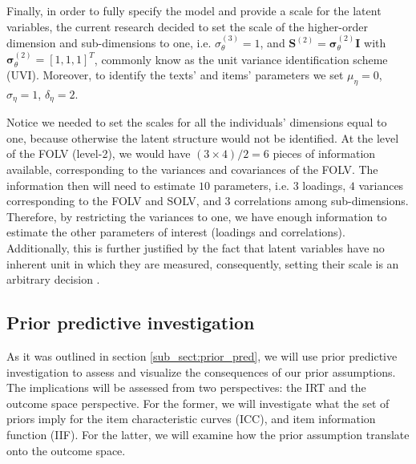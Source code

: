 Finally, in order to fully specify the model and provide a scale for the latent variables, the current research decided to set the scale of the higher-order dimension and sub-dimensions to one, i.e. $\sigma^{(3)}_{\theta} = 1$, and $\mathbf{S}^{(2)} = \pmb{\sigma}^{(2)}_{\theta} \mathbf{I}$ with $\pmb{\sigma}^{(2)}_{\theta} = [1, 1, 1]^{T}$, commonly know as the unit variance identification scheme (UVI). Moreover, to identify the texts' and items' parameters we set $\mu_{\eta} = 0$, $\sigma_{\eta}=1$, $\delta_{\eta}=2$.

Notice we needed to set the scales for all the individuals' dimensions equal to one, because otherwise the latent structure would not be identified. At the level of the FOLV (level-2), we would have $(3 \times 4)/2 = 6$ pieces of information available, corresponding to the variances and covariances of the FOLV. The information then will need to estimate $10$ parameters, i.e. $3$ loadings, $4$ variances corresponding to the FOLV and SOLV, and $3$ correlations among sub-dimensions. Therefore, by restricting the variances to one, we have enough information to estimate the other parameters of interest (loadings and correlations). Additionally, this is further justified by the fact that latent variables have no inherent unit in which they are measured, consequently, setting their scale is an arbitrary  decision \cite{Beaujean_2014}.


\begin{comment}
On the other hand, from the texts and items perspective, at the level of the items (level-2) we would have $(25 \times 26)/2 = 325$ pieces of information available, corresponding to the variances and covariances of the items dimensions. With that information we would need to estimate $30$ parameters, corresponding to $25$ items' dimension variances, and $5$ texts' dimension variances. notice in this case, we do not need to estimate $25$ loadings, as they are assumed to be $1$.
\end{comment}


\subsection{Prior predictive investigation}

As it was outlined in section \ref{sub_sect:prior_pred}, we will use prior predictive investigation to assess and visualize the consequences of our prior assumptions. The implications will be assessed from two perspectives: the IRT and the outcome space perspective. For the former, we will investigate what the set of priors imply for the item characteristic curves (ICC), and item information function (IIF). For the latter, we will examine how the prior assumption translate onto the outcome space.

